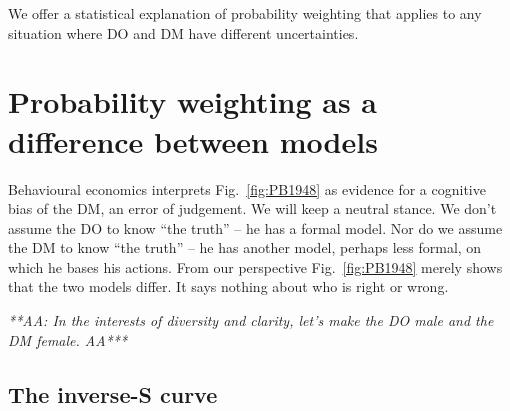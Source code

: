 \documentclass[a4paper, 12pt]{article}
\newcommand{\fref}[1]{Fig.~\ref{fig:#1}}
\newcommand{\seclabel}[1]{\label{sec:#1}}
\newcommand{\MK}[1]{\textcolor{red}{\textit{***MK: #1 MK***}}}
\renewcommand{\AA}[1]{{\it ***AA: #1 AA***}}
\begin{document}
We offer a statistical explanation of probability weighting that applies to any situation where DO and DM have different uncertainties.

%
% 
%



\section{Probability weighting as a difference between models} \seclabel{ModelDiff}
Behavioural economics interprets \fref{PB1948} as evidence for a cognitive bias of the DM, an error of judgement. We will keep a neutral stance. We don't assume the DO to know ``the truth'' -- he has a formal model. Nor do we assume the DM to know ``the truth'' -- he has another model, perhaps less formal, on which he bases his actions. From our perspective \fref{PB1948} merely shows that the two models differ. It says nothing about who is right or wrong.

\AA{In the interests of diversity and clarity, let's make the DO male and the DM female.}

\subsection{The inverse-S curve\seclabel{The_inverse}}
\end{document}
